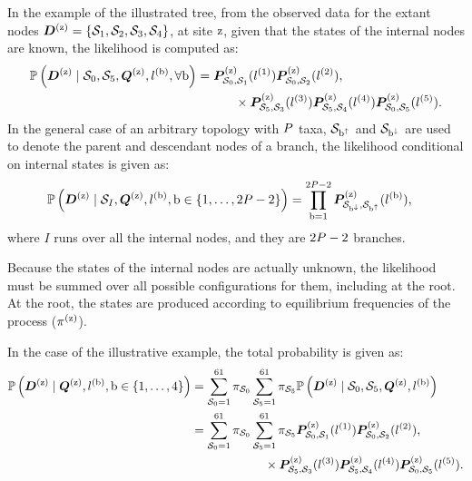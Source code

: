 In the example of the illustrated tree, from the observed data for the extant nodes $\bm{D}^{(\text{z})} = \{ \mathcal{S}_1,\mathcal{S}_2, \mathcal{S}_3, \mathcal{S}_4 \}$, at site $\text{z}$, given that the states of the internal nodes are known, the likelihood is computed as:
\begin{align}
    \mathbb{P} \left(\bm{D}^{(\text{z})} \mid \mathcal{S}_0, \mathcal{S}_5, \bm{Q}^{(\text{z})}, l^{(\text{b})}, \forall \text{b} \right) & = \bm{P}^{(\text{z})}_{\mathcal{S}_0, \mathcal{S}_1}(l^{(1)})
    \bm{P}^{(\text{z})}_{\mathcal{S}_0, \mathcal{S}_2}(l^{(2)}), \\
    & \quad \quad \quad
    \times \bm{P}^{(\text{z})}_{\mathcal{S}_5, \mathcal{S}_3}(l^{(3)})
    \bm{P}^{(\text{z})}_{\mathcal{S}_5, \mathcal{S}_4}(l^{(4)})
    \bm{P}^{(\text{z})}_{\mathcal{S}_0, \mathcal{S}_5}(l^{(5)}). \notag
\end{align}
In the general case of an arbitrary topology with $P$ taxa, $\mathcal{S}_{\text{b}^{\uparrow}}$ and $\mathcal{S}_{\text{b}^{\downarrow}}$ are used to denote the parent and descendant nodes of a branch, the likelihood conditional on internal states is given as:
\begin{align}
    \mathbb{P} \left(\bm{D}^{(\text{z})} \mid \mathcal{S}_{I}, \bm{Q}^{(\text{z})}, l^{(\text{b})}, \text{b} \in \{1, \hdots, 2 P - 2\} \right) & = \prod\limits_{\text{b}=1}^{2 P - 2} \bm{P}^{(\text{z})}_{\mathcal{S}_{\text{b}^{\downarrow}}, \mathcal{S}_{\text{b}^{\uparrow}}}(l^{(\text{b})}),
\end{align}
where $I$ runs over all the internal nodes, and they are $2 P - 2$ branches.

Because the states of the internal nodes are actually unknown, the likelihood must be summed over all possible configurations for them, including at the root.
At the root, the states are produced according to equilibrium frequencies of the process ($\pi^{(\text{z})}$).

In the case of the illustrative example, the total probability is given as:
\begin{align}
    \mathbb{P} \left(\bm{D}^{(\text{z})} \mid \bm{Q}^{(\text{z})}, l^{(\text{b})} , \text{b} \in \{1, \hdots, 4\} \right) & = \sum\limits_{\mathcal{S}_0=1}^{61} \pi_{\mathcal{S}_0} \sum\limits_{\mathcal{S}_5=1}^{61} \pi_{\mathcal{S}_5} \mathbb{P} \left(\bm{D}^{(\text{z})} \mid \mathcal{S}_0, \mathcal{S}_5, \bm{Q}^{(\text{z})}, l^{(\text{b})} \right) \\
    & = \sum\limits_{\mathcal{S}_0=1}^{61} \pi_{\mathcal{S}_0} \sum\limits_{\mathcal{S}_5=1}^{61} \pi_{\mathcal{S}_5} \bm{P}^{(\text{z})}_{\mathcal{S}_0, \mathcal{S}_1}(l^{(1)})
    \bm{P}^{(\text{z})}_{\mathcal{S}_0, \mathcal{S}_2}(l^{(2)}), \\
    & \qquad \qquad \qquad
    \times \bm{P}^{(\text{z})}_{\mathcal{S}_5, \mathcal{S}_3}(l^{(3)})
    \bm{P}^{(\text{z})}_{\mathcal{S}_5, \mathcal{S}_4}(l^{(4)})
    \bm{P}^{(\text{z})}_{\mathcal{S}_0, \mathcal{S}_5}(l^{(5)}).\notag
\end{align}


